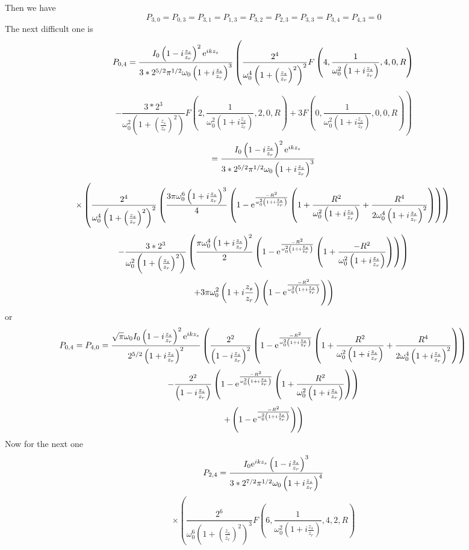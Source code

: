 \documentclass[11pt]{amsart}
\makeatletter
\newcommand{\e}{{\rm e}}				%
\newcommand{\0}{\varnothing}		%
\newcommand{\1}{!}
\newcommand{\2}{@}
\newcommand{\3}{\#}
\newcommand{\4}{\$}
\newcommand{\5}{\%}
\newcommand{\6}{$^\wedge$}
\newcommand{\7}{\&}
\newcommand{\8}{*}
\newcommand{\9}{(}
\makeatother
\begin{document}
Then we have
\[
P_{3,0} = P_{0,3} = P_{3,1} = P_{1,3} = P_{3,2} = P_{2,3} = P_{3,3} = P_{3,4}=P_{4,3} = 0
\]
The next difficult one is
\[
P_{0,4} = \frac{I_0\left(1-i\frac{z_s}{z_r}\right)^2\e^{ikz_s}}{3*2^{5/2}\pi^{1/2}\omega_0\left(1+i\frac{z_s}{z_r}\right)^3}\left(\frac{2^4}{\omega_0^4\left(1+\left(\frac{z_s}{z_r}\right)^2\right)^2}F\left(4,\frac{1}{\omega_0^2\left(1+i\frac{z_s}{z_r}\right)},4,0,R\right)\right.\]\[\left.-\frac{3*2^3}{\omega_0^2\left(1+\left(\frac{z_s}{z_r}\right)^2\right)}F\left(2,\frac{1}{\omega_0^2\left(1+i\frac{z_s}{z_r}\right)},2,0,R\right)+3F\left(0,\frac{1}{\omega_0^2\left(1+i\frac{z_s}{z_r}\right)},0,0,R\right)\right)
\]
\[
=\frac{I_0\left(1-i\frac{z_s}{z_r}\right)^2\e^{ikz_s}}{3*2^{5/2}\pi^{1/2}\omega_0\left(1+i\frac{z_s}{z_r}\right)^3}\]\[\times\left(\frac{2^4}{\omega_0^4\left(1+\left(\frac{z_s}{z_r}\right)^2\right)^2}\left(\frac{3\pi\omega_0^6\left(1+i\frac{z_s}{z_r}\right)^3}{4}\left(1-\e^{\frac{-R^2}{\omega_0^2\left(1+i\frac{z_s}{z_r}\right)}}\left(1+\frac{R^2}{\omega_0^2\left(1+i\frac{z_s}{z_r}\right)}+ \frac{R^4}{2\omega_0^4\left(1+i\frac{z_s}{z_r}\right)^2}\right)\right)\right)\right.
\]
\[
\left.-\frac{3*2^3}{\omega_0^2\left(1+\left(\frac{z_s}{z_r}\right)^2\right)}\left(\frac{\pi\omega_0^4\left(1+i\frac{z_s}{z_r}\right)^2}{2}\left(1-\e^{\frac{-R^2}{\omega_0^2\left(1+i\frac{z_s}{z_r}\right)}}\left(1+\frac{-R^2}{\omega_0^2\left(1+i\frac{z_s}{z_r}\right)}\right)\right)\right)\right.
\]
\[
\left.+3\pi\omega_0^2\left(1+i\frac{z_s}{z_r}\right)\left(1-\e^{\frac{-R^2}{\omega_0^2\left(1+i\frac{z_s}{z_r}\right)}}\right)\right)
\]
or
\[
P_{0,4} = P_{4,0} =\frac{\sqrt{\pi}\omega_0I_0\left(1-i\frac{z_s}{z_r}\right)^2\e^{ikz_s}}{2^{5/2}\left(1+i\frac{z_s}{z_r}\right)^2}\left(\frac{2^2}{\left(1-i\frac{z_s}{z_r}\right)^2}\left(1-\e^{\frac{-R^2}{\omega_0^2\left(1+i\frac{z_s}{z_r}\right)}}\left(1+\frac{R^2}{\omega_0^2\left(1+i\frac{z_s}{z_r}\right)}+ \frac{R^4}{2\omega_0^4\left(1+i\frac{z_s}{z_r}\right)^2}\right)\right)\right.
\]
\[
\left. -\frac{2^2}{\left(1-i\frac{z_s}{z_r}\right)}\left(1-\e^{\frac{-R^2}{\omega_0^2\left(1+i\frac{z_s}{z_r}\right)}}\left(1+\frac{R^2}{\omega_0^2\left(1+i\frac{z_s}{z_r}\right)}\right)\right)\right.
\]
\[
\left. + \left(1-\e^{\frac{-R^2}{\omega_0^2\left(1+i\frac{z_s}{z_r}\right)}}\right)\right)
\]
Now for the next one
\[
P_{2,4} = \frac{I_0\e^{ikz_s}\left(1-i\frac{z_s}{z_r}\right)^3}{3*2^{7/2}\pi^{1/2}\omega_0\left(1+i\frac{z_s}{z_r}\right)^4}
\]
\[
\times\left(\frac{2^6}{\omega_0^6\left(1+\left(\frac{z_s}{z_r}\right)^2\right)^3}F\left(6,\frac{1}{\omega_0^2\left(1+i\frac{z_s}{z_r}\right)},4,2,R\right) \right.
\]
\end{document}

